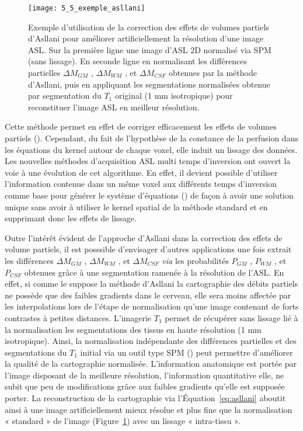 \begin{figure}[!t]
\centering
\texttt{[image: 5\_5\_exemple\_asllani]}
\caption{Exemple d'utilisation de la correction des effets de volumes partiels d’Asllani pour améliorer
artificiellement la résolution d’une image ASL. Sur la première ligne une image d’ASL 2D normalisé via SPM
(sans lissage). En seconde ligne en normalisant les différences partielles $\Delta M_{GM}$ , $\Delta M_{WM}$  , et $\Delta M_{CSF}$ obtenues
par la méthode d’Asllani, puis en appliquant les segmentations normalisées obtenue par segmentation du $T_1$
original (1 mm isotropique) pour reconstituer l’image ASL en meilleur résolution.
}
\label{fig:5_5_exemple_asllani}	
\end{figure}
Cette méthode permet en effet de corriger efficacement les effets de volumes partiels (\cite{Asllani2008}).
Cependant, du fait de l’hypothèse de la constance de la perfusion dans les équations du kernel autour
de chaque voxel, elle induit un lissage des données. Les nouvelles méthodes d’acquisition ASL multi
temps d’inversion ont ouvert la voie à une évolution de cet algorithme. En effet, il devient possible
d’utiliser l’information contenue dans un même voxel aux différents temps d’inversion comme base
pour générer le système d’équations (\cite{Chappell2011}) de façon à avoir une solution unique sans avoir à utiliser le
kernel spatial de la méthode standard et en supprimant donc les effets de lissage.

Outre l’intérêt évident de l’approche d’Asllani dans la correction des effets de volume partiels,
il est posssible d’envisager d’autres applications une fois extrait les différences $\Delta M_{GM}$ , $\Delta M_{WM}$  , et $\Delta M_{CSF}$ {\em via} les probabilités $P_{GM}$ , $P_{WM}$ , et $P_{CSF}$ obtenues grâce à une segmentation ramenée à la résolution
de l’ASL. En effet, si comme le suppose la méthode d’Asllani la cartographie des débits partiels ne
possède que des faibles gradients dans le cerveau, elle sera moins affectée par les interpolations lors
de l’étape de normalisation qu’une image contenant de forts contrastes à petites distances. L’imagerie
$T_1$ permet de récupérer sans lissage lié à la normalisation les segmentations des tissus en haute
résolution (1 mm isotropique). Ainsi, la normalisation indépendante des différences partielles et des
segmentations du $T_1$ initial via un outil type SPM (\cite{Friston2006}) peut permettre d’améliorer la qualité de la
cartographie normalisée. L’information anatomique est portée par l’image disposant de la meilleure
résolution, l’information quantitative elle, ne subit que peu de modifications grâce aux faibles
gradients qu’elle est supposée porter. La reconstruction de la cartographie via l’Équation~\ref{eq:asllani} aboutit
ainsi à une image artificiellement mieux résolue et plus fine que la normalisation « standard » de
l’image (Figure~\ref{fig:5_5_exemple_asllani}) avec un lissage « intra-tissu ».
